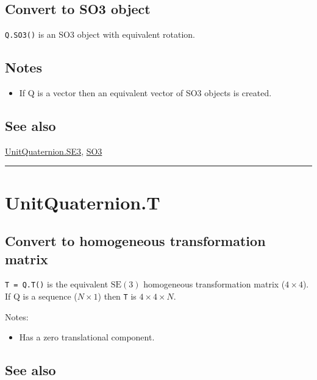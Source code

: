 \subsection*{Convert to SO3 object}


\texttt{Q.SO3()} is an SO3 object with equivalent rotation.


\subsection*{Notes}
\begin{itemize}
  \item If Q is a vector then an equivalent vector of SO3 objects is created.
\end{itemize}

\subsection*{See also}


\hyperlink{UnitQuaternion.SE3}{\color{blue} UnitQuaternion.SE3}, \hyperlink{SO3}{\color{blue} SO3}

\vspace{1.5ex}\hrule

\hypertarget{UnitQuaternion.T}{\section*{UnitQuaternion.T}}
\subsection*{Convert to homogeneous transformation matrix}


\texttt{T = Q.T()} is the equivalent $\mbox{SE}(3)$ homogeneous transformation
matrix ($4 \times 4$).  If Q is a sequence ($N \times 1$) then \texttt{T} is $4 \times 4 \times N$.



Notes:

\begin{itemize}
  \item Has a zero translational component.
\end{itemize}

\subsection*{See also}



